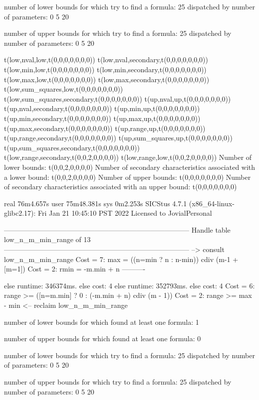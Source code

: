 number of lower bounds for which try to find a formula: 25
dispatched by number of parameters: 0  5  20

number of upper bounds for which try to find a formula: 25
dispatched by number of parameters: 0  5  20

t(low,nval,low,t(0,0,0,0,0,0,0))
t(low,nval,secondary,t(0,0,0,0,0,0,0))
t(low,min,low,t(0,0,0,0,0,0,0))
t(low,min,secondary,t(0,0,0,0,0,0,0))
t(low,max,low,t(0,0,0,0,0,0,0))
t(low,max,secondary,t(0,0,0,0,0,0,0))
t(low,sum_squares,low,t(0,0,0,0,0,0,0))
t(low,sum_squares,secondary,t(0,0,0,0,0,0,0))
t(up,nval,up,t(0,0,0,0,0,0,0))
t(up,nval,secondary,t(0,0,0,0,0,0,0))
t(up,min,up,t(0,0,0,0,0,0,0))
t(up,min,secondary,t(0,0,0,0,0,0,0))
t(up,max,up,t(0,0,0,0,0,0,0))
t(up,max,secondary,t(0,0,0,0,0,0,0))
t(up,range,up,t(0,0,0,0,0,0,0))
t(up,range,secondary,t(0,0,0,0,0,0,0))
t(up,sum_squares,up,t(0,0,0,0,0,0,0))
t(up,sum_squares,secondary,t(0,0,0,0,0,0,0))
t(low,range,secondary,t(0,0,2,0,0,0,0))
t(low,range,low,t(0,0,2,0,0,0,0))
Number of lower bounds:                                             t(0,0,2,0,0,0,0)
Number of secondary characteristics associated with a lower bound:  t(0,0,2,0,0,0,0)
Number of upper bounds:                                             t(0,0,0,0,0,0,0)
Number of secondary characteristics associated with an upper bound: t(0,0,0,0,0,0,0)

real	76m4.657s
user	75m48.381s
sys	0m2.253s
SICStus 4.7.1 (x86_64-linux-glibc2.17): Fri Jan 21 10:45:10 PST 2022
Licensed to JovialPersonal


--------------------------------------------------------------------------------
Handle table low_n_m_min_range of 13
--------------------------------------------------------------------------------
--> consult low_n_m_min_range
Cost =  7:  max  = ((n=min ? n : n-min)) cdiv (m-1 + [m=1]) %
Cost =  2:  rmin = -m.min + n
----------

else runtime: 346374ms. else cost: 4
else runtime: 352793ms. else cost: 4
Cost =  6:  range >= ([n=m.min] ? 0 : (-m.min + n) cdiv (m - 1)) %
Cost =  2:  range >= max - min
<-- reclaim low_n_m_min_range

number of lower bounds for which found at least one formula: 1

number of upper bounds for which found at least one formula: 0

number of lower bounds for which try to find a formula: 25
dispatched by number of parameters: 0  5  20

number of upper bounds for which try to find a formula: 25
dispatched by number of parameters: 0  5  20

